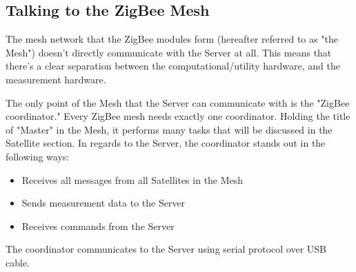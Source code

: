 
\subsection{Talking to the ZigBee Mesh}
The mesh network that the ZigBee modules
form (hereafter referred to as "the Mesh") doesn't directly communicate with the Server
at all. This means that there's a clear separation between the computational/utility
hardware, and the measurement hardware.

The only point of the Mesh that the Server can communicate with is the "ZigBee coordinator."
Every ZigBee mesh needs exactly one coordinator. Holding the title of "Master" in the
Mesh, it performs many tasks that will be discussed in the Satellite section. 
In regards to the Server, the coordinator stands out in the following ways:

\begin{itemize}
	\item Receives all messages from all Satellites in the Mesh
	\item Sends measurement data to the Server
	\item Receives commands from the Server
\end{itemize}

The coordinator communicates to the Server using serial protocol over USB cable. 

